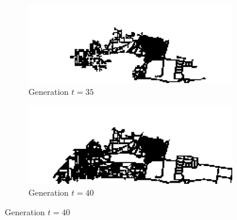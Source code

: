 \begin{figure}[H]
\begin{multicols}{2}
\begin{subfigure}{.5\textwidth}
  \centering
  \includegraphics[width=1\linewidth]{Figures/Chapter4/generation-35-melusi}
  \caption{Generation $t = 35$}
\end{subfigure}
\begin{subfigure}{.5\textwidth}
  \centering
  \includegraphics[width=1\linewidth]{Figures/Chapter4/generation-40-melusi}
  \caption{Generation $t = 40$}
\end{subfigure}
\end{multicols}


\end{figure}
